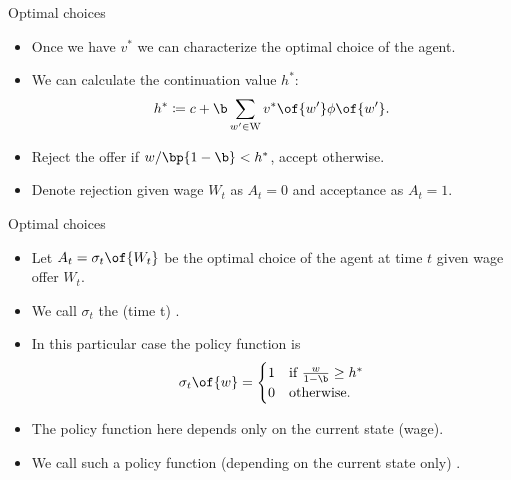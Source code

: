 \documentclass[11pt,xcolor={dvipsnames},aspectratio=159,hyperref={pdftex,pdfpagemode=UseNone,hidelinks,pdfdisplaydoctitle=true},usepdftitle=false]{beamer}
\begin{document}
\begin{frame}{Optimal choices}
    \begin{itemize}
        \item Once we have $v^*$ we can characterize the optimal choice of the agent.
        \item We can calculate the continuation value $h^*$: \begin{align*}
            h^* \coloneq c + \b \sum_{w^\prime \in \text{W}} v^*\of{w^\prime}\phi\of{w^\prime}. \end{align*}
        \item Reject the offer if $w/\bp{1-\b} < h^*$, accept otherwise. 
        \item Denote rejection given wage $W_t$ as $A_t = 0$ and acceptance as $A_t = 1$.

    \end{itemize}
\end{frame}

\begin{frame}{Optimal choices}
    \begin{itemize}
        \item Let $A_t =  \sigma_t \of{W_t}$ be the optimal choice of the agent at time $t$ given wage offer $W_t$.
        \item We call $\sigma_t$ the (time t) .
        \item In this particular case the policy function is \begin{align*}
            \sigma_t\of{w} = \begin{cases}
                1 & \text{if } \frac{w}{1-\b} \geq h^* \\
                0 & \text{otherwise}.
            \end{cases}
        \end{align*}
        \item The policy function here depends only on the current state (wage). 
        \item We call such a policy function (depending on the current state only) .
    \end{itemize}
\end{frame}
\end{document}
